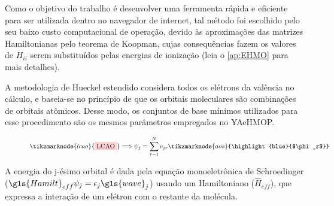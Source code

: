 Como o objetivo do trabalho é desenvolver uma ferramenta rápida e eficiente para ser utilizada dentro no navegador de internet, tal método foi escolhido pelo seu baixo custo computacional de operação, devido às aproximações das matrizes Hamiltonianas pelo teorema de Koopman, cujas consequências fazem os valores de $H_{ii}$ serem substituídos pelas energias de ionização (leia o \autoref{ap:EHMO} para mais detalhes).

A metodologia de Hueckel estendido considera todos os elétrons da valência no cálculo, e baseia-se no princípio de que os orbitais moleculares são combinações de orbitais atômicos. Desse modo, os conjuntos de base mínimos utilizados para esse procedimento são os mesmos parâmetros empregados no \gls{YAeHMOP}\autocite{Avery2017}. 

\begin{figure}[htb]
    \vspace{2\baselineskip}
\begin{equation}
    \label{eq:LCAO}
    \tikzmarknode{lcao}{\highlight{red}{LCAO}} \Longrightarrow \psi_j = \sum_{r=1}^{N} c_{jr} \tikzmarknode{aos}{\highlight{blue}{$\phi_r$}}
\end{equation}
\vspace{2\baselineskip}
\end{figure}

A energia do j-ésimo orbital é dada pela equação monoeletrônica de Schroedinger ($\gls{Hamilt}_{eff} \psi_j = \epsilon_j \gls{wave}_j$) usando um Hamiltoniano ($\hat{H}_{eff}$), que expressa a interação de um elétron com o restante da molécula.

